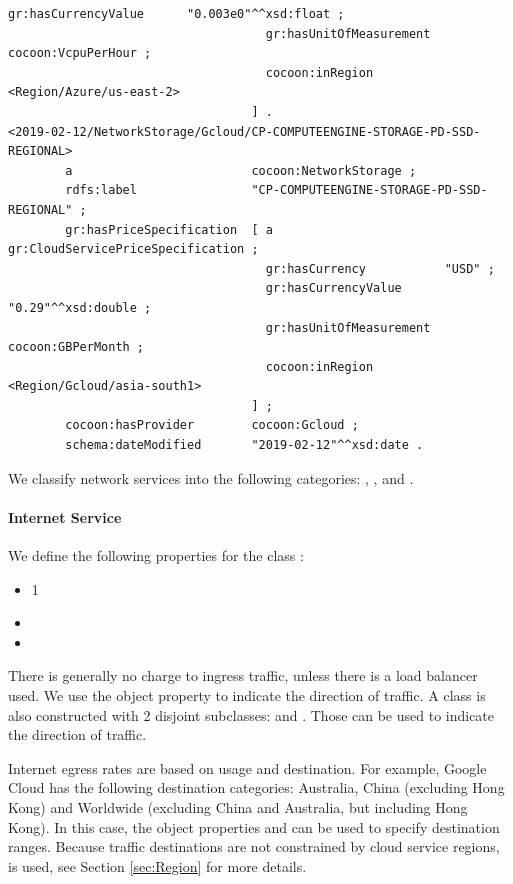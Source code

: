\begin{lstlisting}[caption={Storage},label={lst:Storage}]
                                    gr:hasCurrencyValue      "0.003e0"^^xsd:float ;
                                    gr:hasUnitOfMeasurement  cocoon:VcpuPerHour ;
                                    cocoon:inRegion         <Region/Azure/us-east-2>
                                  ] .
<2019-02-12/NetworkStorage/Gcloud/CP-COMPUTEENGINE-STORAGE-PD-SSD-REGIONAL>
        a                         cocoon:NetworkStorage ;
        rdfs:label                "CP-COMPUTEENGINE-STORAGE-PD-SSD-REGIONAL" ;
        gr:hasPriceSpecification  [ a                        gr:CloudServicePriceSpecification ;
                                    gr:hasCurrency           "USD" ;
                                    gr:hasCurrencyValue      "0.29"^^xsd:double ;
                                    gr:hasUnitOfMeasurement  cocoon:GBPerMonth ;
                                    cocoon:inRegion         <Region/Gcloud/asia-south1>
                                  ] ;
        cocoon:hasProvider        cocoon:Gcloud ;
        schema:dateModified       "2019-02-12"^^xsd:date .
\end{lstlisting}

\label{sec:Network}
We classify network services into the following categories:
, ,  and .

\paragraph{Internet Service}
\label{sec:Internet}
We define the following properties for the class :
\begin{itemize}
  \item[]   1 
  \item[]   
  \item[]   
\end{itemize}
There is generally no charge to ingress traffic,
unless there is a load balancer used.
We use the  object property to indicate the direction of traffic.
A class  is also constructed with 2 disjoint subclasses:
 and . Those can be used to indicate the direction of traffic.

Internet egress rates are based on usage and destination.
For example, Google Cloud has the following destination categories:
Australia, China (excluding Hong Kong) and
Worldwide (excluding China and Australia, but including Hong Kong).
In this case, the object properties  and  can be used to specify destination ranges.
Because traffic destinations are not constrained by cloud service regions,
 is used, see Section \ref{sec:Region} for more details.

